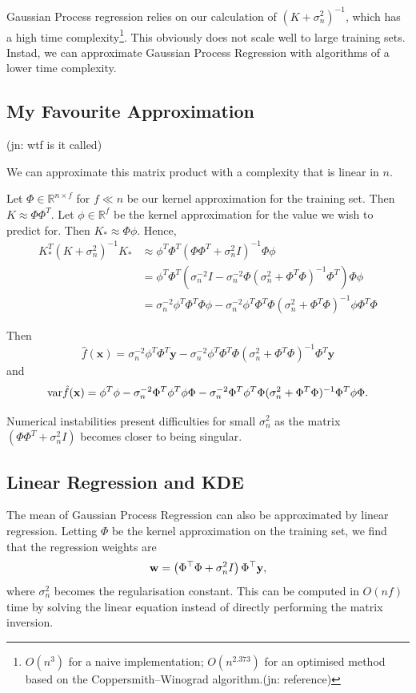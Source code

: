 \documentclass[11pt,twoside]{report}
\newcommand\bw{\mathbf{w}}
\newcommand\bx{\mathbf{x}}
\newcommand\by{\mathbf{y}}
\newcommand\bbR{\mathbb{R}}
\newcommand\var{\mathrm{var}}
\newcommand\jn[1]{{\color{red}(jn: #1)}}
\begin{document}
Gaussian Process regression relies on our calculation of $(K+\sigma_n^2)^{-1}$, which has a high time complexity\footnote{$O(n^3)$ for a naive implementation; $O(n^{2.373})$ for an optimised method based on the Coppersmith–Winograd algorithm.\jn{reference}}. This obviously does not scale well to large training sets. Instad, we can approximate Gaussian Process Regression with algorithms of a lower time complexity.

\subsection{My Favourite Approximation}

\jn{wtf is it called}

We can approximate this matrix product with a complexity that is linear in $n$.

Let $\Phi \in \bbR^{n \times f}$ for $f \ll n$ be our kernel approximation for the training set. Then $K \approx \Phi \Phi^T$. Let $\phi \in \bbR^{f}$ be the kernel approximation for the value we wish to predict for. Then $K_* \approx \Phi \phi$. Hence,\begin{align*}
    K_*^T(K+\sigma_n^2)^{-1}K_* &\approx \phi^T\Phi^T  \left(\Phi \Phi^T + \sigma_n^2I\right)^{-1} \Phi\phi \\
    &= \phi^T\Phi^T  \left( \sigma_n^{-2}I - \sigma_n^{-2}\Phi(\sigma_n^{2} + \Phi^T\Phi)^{-1}\Phi^T\right) \Phi\phi \\
    &=  \sigma_n^{-2}\phi^T\Phi^T\Phi\phi - \sigma_n^{-2}\phi^T\Phi^T \Phi(\sigma_n^{2} + \Phi^T\Phi)^{-1}\phi\Phi^T\Phi
\end{align*}

Then \[
    \hat f(\bx) = \sigma_n^{-2} \phi^T\Phi^T\by - \sigma_n^{-2} \phi^T\Phi^T\Phi(\sigma_n^{2} + \Phi^T\Phi)^{-1}\Phi^T\by
\] and \[
    \var \hat f(\bx) = \phi^T\phi - \sigma_n^{-2}\Phi^T \phi^T\phi\Phi - \sigma_n^{-2}\Phi^T \phi^T\Phi(\sigma_n^{2} + \Phi^T\Phi)^{-1}\Phi^T\phi\Phi\text.
\]

Numerical instabilities present difficulties for small $\sigma_n^2$ as the matrix $(\Phi\Phi^T + \sigma_n^2I)$ becomes closer to being singular.

\subsection{Linear Regression and KDE}

The mean of Gaussian Process Regression can also be approximated by linear regression. Letting $\Phi$ be the kernel approximation on the training set, we find that the regression weights are\[
    \bw = \left(\Phi^\top\Phi + \sigma_n^2 I\right) \Phi^\top\by\text,
\] where $\sigma_n^2$ becomes the regularisation constant. This can be computed in $O(nf)$ time by solving the linear equation instead of directly performing the matrix inversion.
\end{document}

